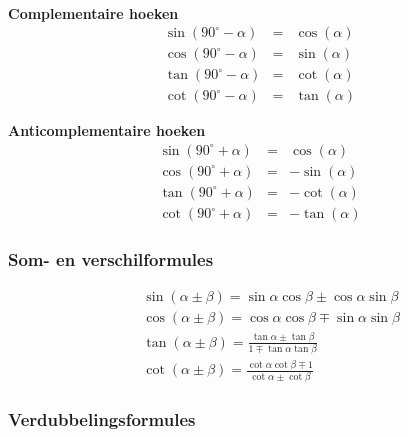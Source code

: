 \ \\
\begin{minipage}[b]{0.5\linewidth}
\textbf{Complementaire hoeken}
\begin{eqnarray*}
\sin\left(90^\circ-\alpha\right) &=& \cos(\alpha)\\
\cos\left(90^\circ-\alpha\right) &=& \sin(\alpha)\\
\tan\left(90^\circ-\alpha\right) &=& \cot(\alpha)\\
\cot\left(90^\circ-\alpha\right) &=& \tan(\alpha)
\end{eqnarray*}
\end{minipage}
\hspace{0.5cm}
\begin{minipage}[b]{0.5\linewidth}
\textbf{Anticomplementaire hoeken}
\begin{eqnarray*}
\sin\left(90^\circ+\alpha\right) &=& \cos(\alpha)\\
\cos\left(90^\circ+\alpha\right) &=& -\sin(\alpha)\\
\tan\left(90^\circ+\alpha\right) &=& -\cot(\alpha)\\
\cot\left(90^\circ+\alpha\right) &=& -\tan(\alpha)
\end{eqnarray*}
\end{minipage}

\subsubsection{Som- en verschilformules}

\begin{minipage}[b]{0.6\linewidth}
\begin{eqnarray*}
&&\sin(\alpha \pm \beta) = \sin\alpha\cos\beta \pm \cos\alpha\sin\beta\\
&&\cos(\alpha \pm \beta) = \cos\alpha\cos\beta \mp \sin\alpha\sin\beta\\
&&\tan(\alpha \pm \beta) = \frac{\tan\alpha\pm\tan\beta}{1\mp \tan\alpha\tan\beta} \\
&&\cot(\alpha \pm \beta) = \frac{\cot \alpha \cot\beta \mp 1}{\cot \alpha \pm \cot \beta}
\end{eqnarray*}
\end{minipage}

\subsubsection{Verdubbelingsformules}

